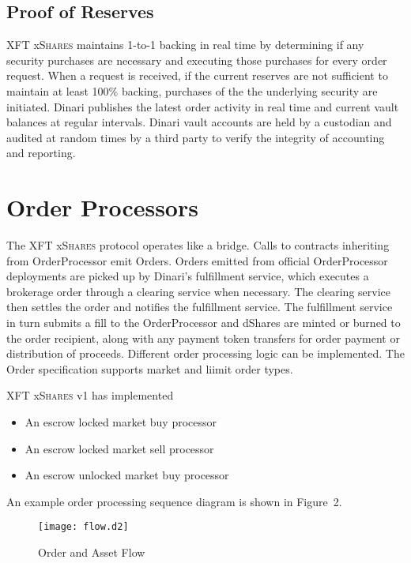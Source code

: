 \documentclass[sigconf,nonacm,prologue,table]{acmart}
\newcommand{\dshares}{\textsc{XFT} x\textsc{Shares} }
\begin{document}
\subsection{Proof of Reserves}

\dshares maintains 1-to-1 backing in real time by determining if any security purchases are necessary and executing those purchases for every order request. When a request is received, if the current reserves are not sufficient to maintain at least 100\% backing, purchases of the the underlying security are initiated. Dinari publishes the latest order activity in real time and current vault balances at regular intervals. Dinari vault accounts are held by a custodian and audited at random times by a third party to verify the integrity of accounting and reporting. 

\section{Order Processors}
\label{sec:Processors}

The \dshares protocol operates like a bridge. Calls to contracts inheriting from OrderProcessor emit Orders. Orders emitted from official OrderProcessor deployments are picked up by Dinari's fulfillment service, which executes a brokerage order through a clearing service when necessary. The clearing service then settles the order and notifies the fulfillment service. The fulfillment service in turn submits a fill to the OrderProcessor and dShares are minted or burned to the order recipient, along with any payment token transfers for order payment or distribution of proceeds. Different order processing logic can be implemented. The Order specification supports market and liimit order types.

\dshares v1 has implemented
\begin{itemize}
    \item An escrow locked market buy processor
    \item An escrow locked market sell processor
    \item An escrow unlocked market buy processor
\end{itemize}

An example order processing sequence diagram is shown in Figure~2.

\begin{figure}
    \centering
    \texttt{[image: flow.d2]}
    \caption{Order and Asset Flow}
    \label{fig:flow}
\end{figure}
\end{document}
